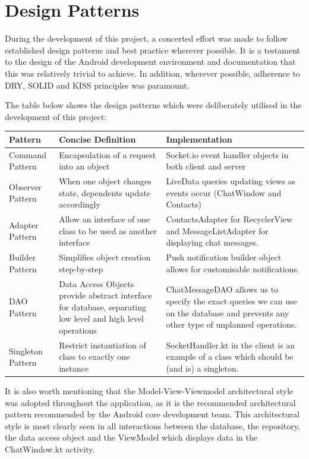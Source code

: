 \documentclass{mproj}
\begin{document}
\section{Design Patterns}
During the development of this project, a concerted effort was made to follow established design patterns and best practice wherever possible. It is a testament to the design of the Android development environment and documentation that this was relatively trivial to achieve. 
In addition, wherever possible, adherence to DRY\cite{10.5555/320326}, SOLID\cite{martin2000design} and KISS principles was paramount.


The table below shows the design patterns which were deliberately utilised in the development of this project:
\begin{center}
\begin{tabular}{ |p{4cm}|p{4.5cm}|p{5.0cm}|}
	\hline
	Pattern & Concise Definition & Implementation\\
	\hline
	Command Pattern\cite{sarcar2020command} & Encapsulation of a request into an object  & Socket.io event handler objects in both client and server\\
	\hline
	Observer Pattern\cite{eales2005observer} & When one object changes state, dependents update accordingly & LiveData queries updating views as events occur (ChatWindow and Contacts)\\
	\hline
	Adapter Pattern\cite{harmes2008adapter} & Allow an interface of one class to be used as another interface & ContactsAdapter for RecyclerView and MessageListAdapter for displaying chat messages.\\
	\hline
	Builder Pattern\cite{sarcar2016builder} & Simplifies object creation step-by-step & Push notification builder object allows for customisable notifications.\\
	\hline
	DAO Pattern\cite{berger2005data} & Data Access Objects provide abstract interface for database, separating low level and high level operations & ChatMessageDAO allows us to specify the exact queries we can use on the database and prevents any other type of unplanned operations.\\
	\hline
	Singleton Pattern\cite{stencel2008implementation} & Restrict instantiation of class to exactly one instance & SocketHandler.kt in the client is an example of a class which should be (and is) a singleton.\\
	\hline
\end{tabular}
\end{center}
It is also worth mentioning that the Model-View-Viewmodel architectural style was adopted throughout the application, as it is the recommended architectural pattern recommended by the Android core development team\cite{androiddevelopers}. 
This architectural style is most clearly seen in all interactions between the database, the repository, the data access object and the ViewModel which displays data in the ChatWindow.kt activity.
\end{document}
